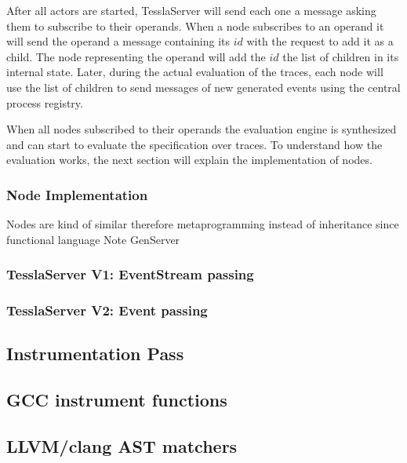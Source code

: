 After all actors are started, TesslaServer will send each one a message asking them to subscribe to their operands.
When a node subscribes to an operand it will send the operand a message containing its \(\mathit{id}\) with the request to add it as a child.
The node representing the operand will add the \(\mathit{id}\) the list of children in its internal state.
Later, during the actual evaluation of the traces, each node will use the list of children to send messages of new generated events using the central process registry.

When all nodes subscribed to their operands the evaluation engine is synthesized and can start to evaluate the specification over traces.
To understand how the evaluation works, the next section will explain the implementation of nodes.

\subsubsection{Node Implementation}
Nodes are kind of similar therefore metaprogramming instead of inheritance since functional language
Note GenServer

\subsubsection{TesslaServer V1: EventStream passing}
\subsubsection{TesslaServer V2: Event passing}

\subsection{Instrumentation Pass}
\label{sec:implementation:instrumentation}


\subsection{GCC instrument functions}
\subsection{LLVM/clang AST matchers}
